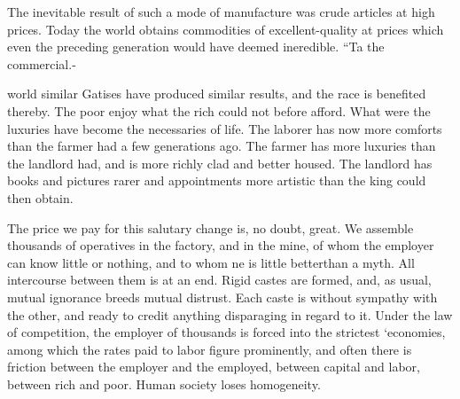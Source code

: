 \documentclass[11pt,openany]{book}
\begin{document}
The inevitable result of such a mode of manufacture was crude articles at high prices. Today the world obtains commodities of excellent-quality at prices which even the preceding generation would have deemed ineredible. ``Ta the commercial.-

world similar Gatises have produced similar results, and the race is benefited thereby. The poor enjoy what the rich could not before afford. What were the luxuries have become the necessaries of life. The laborer has now more comforts than the farmer had a few generations ago. The farmer has more luxuries than the landlord had, and is more richly clad and better housed. The landlord has books and pictures rarer and appointments more artistic than the king could then obtain.

The price we pay for this salutary change is, no doubt, great. We assemble thousands of operatives in the factory, and in the mine, of whom the employer can know little or nothing, and to whom ne is little betterthan a myth. All intercourse between them is at an end. Rigid castes are formed, and, as usual, mutual ignorance breeds mutual distrust. Each caste is without sympathy with the other, and ready to credit anything disparaging in regard to it. Under the law of competition, the employer of thousands is forced into the strictest `economies, among which the rates paid to labor figure prominently, and often there is friction between the employer and the employed, between capital and labor, between rich and poor. Human society loses homogeneity.
\end{document}
